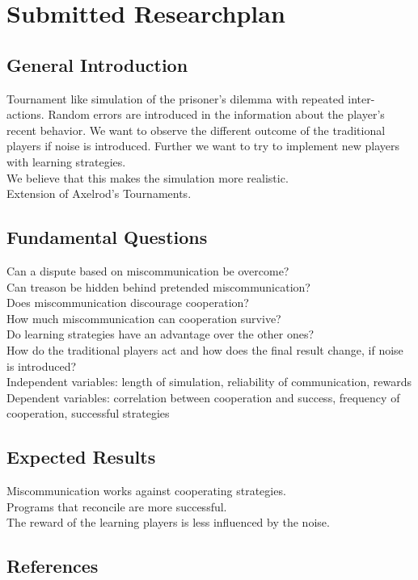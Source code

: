 \section{Submitted Researchplan}
\subsection{General Introduction}
Tournament like simulation of the prisoner's dilemma with repeated inter-
actions. Random errors are introduced in the information about the player's 
recent behavior. We want to observe the different outcome of the traditional
players if noise is introduced. Further we want to try to implement new 
players with learning strategies. \\
We believe that this makes the simulation more realistic.\\
Extension of Axelrod's Tournaments.

\subsection{Fundamental Questions}
Can a dispute based on miscommunication be overcome?\\
Can treason be hidden behind pretended miscommunication?\\
Does miscommunication discourage cooperation?\\
How much miscommunication can cooperation survive?\\
Do learning strategies have an advantage over the other ones?\\
How do the traditional players act and how does the final result change, 
if noise is introduced?\\
Independent variables: length of simulation, reliability of communication, rewards\\
Dependent variables: correlation between cooperation and success, frequency of cooperation, successful strategies

\subsection{Expected Results}
Miscommunication works against cooperating strategies.\\ 
Programs that reconcile are more successful.\\
The reward of the learning players is less influenced by the noise.

\subsection{References}

